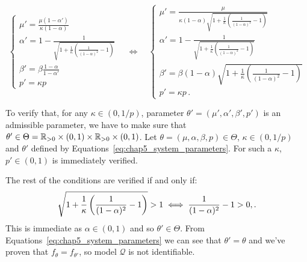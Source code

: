 \begin{subappendices}
    \begin{equation}\label{eq:chap5_system_parameters}
        \begin{cases*}
            \mu' = \frac{\mu(1-\alpha')}{\kappa(1-\alpha)}\\
            \alpha' = 1 - \frac{1}{\sqrt{1 + \frac{1}{\kappa}\left(\frac{1}{(1-\alpha)^2} - 1\right)}}\\
            \beta' = \beta \frac{1-\alpha}{1-\alpha'}\\
            p' = \kappa p
        \end{cases*}
        \quad\iff\quad
        \begin{cases}
            \mu' = \frac{\mu}{\kappa(1-\alpha)\sqrt{1 + \frac{1}{\kappa}\left(\frac{1}{(1-\alpha)^2} - 1\right)}}\\
            \alpha' = 1 - \frac{1}{\sqrt{1 + \frac{1}{\kappa}\left(\frac{1}{(1-\alpha)^2} - 1\right)}}\\
            \beta' = \beta (1-\alpha) \sqrt{1 + \frac{1}{\kappa}\left(\frac{1}{(1-\alpha)^2} - 1\right)}\\
            p' = \kappa p\,.
        \end{cases}
    \end{equation}
    
    To verify that, for any $\kappa\in(0,1/p)$, parameter $\theta' = (\mu', \alpha', \beta', p')$ is an admissible parameter,
    we have to make sure that $\theta' \in \Theta = {\mathbb R}_{>0}\times (0,1) \times {\mathbb R}_{>0} \times (0,1)$.
    Let $\theta = (\mu, \alpha, \beta, p)\in\Theta$, $\kappa\in(0,1/p)$ and $\theta'$ defined by Equations~\eqref{eq:chap5_system_parameters}.
    For such a $\kappa$, $p'\in(0,1)$ is immediately verified.

    The rest of the conditions are verified if and only if: 
    \[\sqrt{1 + \frac{1}{\kappa}\left(\frac{1}{(1-\alpha)^2} - 1\right)} > 1 \iff \frac{1}{(1-\alpha)^2} - 1 > 0\\,.\]
    This is immediate as $\alpha\in(0,1)$ and so $\theta'\in\Theta$. 
    From Equations~\eqref{eq:chap5_system_parameters}
    we can see that $\theta'=\theta$ and we've proven that $f_\theta = f_{\theta'}$,
    so model $\mathcal{Q}$ is not identifiable.


\end{subappendices}
